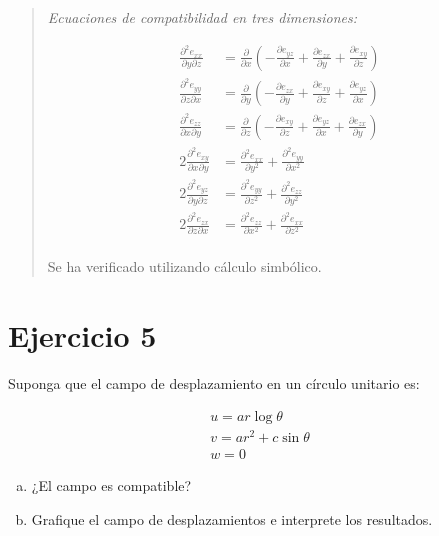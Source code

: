 \documentclass[a4paper,10pt,twoside,final,spanish]{article}
\begin{document}
\begin{quote}
\textit{Ecuaciones de compatibilidad en tres dimensiones:}

\begin{align*}
\frac{\partial^{2}e_{xx}}{\partial y \partial z}
&= \frac{\partial}{\partial x}\left(
-\frac{\partial e_{yz}}{\partial x}
+\frac{\partial e_{zx}}{\partial y}
+\frac{\partial e_{xy}}{\partial z}\right) \\
\frac{\partial^{2}e_{yy}}{\partial z \partial x}
&= \frac{\partial}{\partial y}\left(
-\frac{\partial e_{zx}}{\partial y}
+\frac{\partial e_{xy}}{\partial z}
+\frac{\partial e_{yz}}{\partial x}\right) \\
\frac{\partial^{2}e_{zz}}{\partial x \partial y}
&= \frac{\partial}{\partial z}\left(
-\frac{\partial e_{xy}}{\partial z}
+\frac{\partial e_{yz}}{\partial x}
+\frac{\partial e_{zx}}{\partial y}\right) \\
2\frac{\partial^{2}e_{xy}}{\partial x \partial y}
&= \frac{\partial^{2}e_{xx}}{\partial y^{2}}
+\frac{\partial^{2}e_{yy}}{\partial x^{2}} \\
2\frac{\partial^{2}e_{yz}}{\partial y \partial z}
&= \frac{\partial^{2}e_{yy}}{\partial z^{2}}
+\frac{\partial^{2}e_{zz}}{\partial y^{2}} \\
2\frac{\partial^{2}e_{zx}}{\partial z \partial x}
&= \frac{\partial^{2}e_{zz}}{\partial x^{2}}
+\frac{\partial^{2}e_{xx}}{\partial z^{2}} \\
\end{align*}

Se ha verificado utilizando cálculo simbólico.

\end{quote}

\section*{Ejercicio 5}

Suponga que el campo de desplazamiento en un círculo unitario es:
 
\[
\begin{array}{l}
u=ar\log\theta       \\
v=ar^{2}+c\sin\theta \\
w=0
\end{array}
\] 

\begin{enumerate}[a)]
\item ¿El campo es compatible?
\item Grafique el campo de desplazamientos e interprete los resultados.
\end{enumerate}
\end{document}
